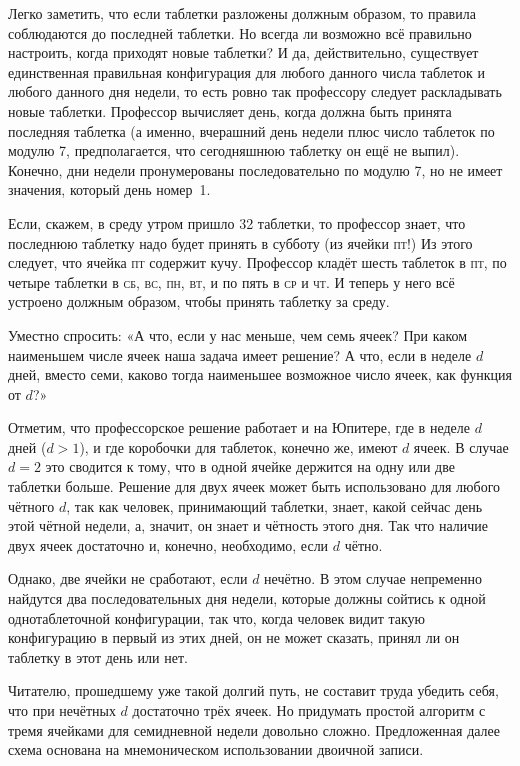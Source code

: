 Легко заметить, что если таблетки разложены должным образом, то правила соблюдаются до последней таблетки.
Но всегда ли возможно всё правильно настроить, когда приходят новые таблетки?
И да, действительно, существует единственная правильная конфигурация для любого данного числа таблеток и любого данного дня недели, то есть ровно так профессору следует раскладывать новые таблетки.
Профессор вычисляет день, когда должна быть принята последняя таблетка (а именно, вчерашний день недели плюс число таблеток по модулю 7,
предполагается, что сегодняшнюю таблетку он ещё не выпил).
Конечно, дни недели пронумерованы последовательно  по модулю 7, но не имеет значения, который день номер~1.

Если, скажем, в среду утром пришло 32 таблетки, то профессор знает, что последнюю таблетку надо будет принять в субботу (из ячейки \textsc{пт}!) Из этого следует, что ячейка \textsc{пт} содержит кучу.
Профессор кладёт шесть таблеток в \textsc{пт}, по четыре таблетки в \textsc{сб}, \textsc{вс}, \textsc{пн}, \textsc{вт}, и по пять в \textsc{ср} и \textsc{чт}.
И теперь у него всё устроено должным образом, чтобы принять таблетку за среду.
\heart

Уместно спросить:
«А что, если у нас меньше, чем семь ячеек?
При каком наименьшем числе ячеек наша задача имеет решение?
А что, если в неделе $d$ дней, вместо семи,
каково тогда наименьшее возможное число ячеек, как функция от $d$?»

Отметим, что профессорское решение работает и на Юпитере, где в неделе $d$ дней ($d>1$), и где коробочки для таблеток, конечно же, имеют $d$ ячеек.
В случае $d=2$ это сводится к тому, что в одной ячейке держится на одну или две таблетки больше.
Решение для двух ячеек может быть использовано для любого чётного $d$, так как человек, принимающий таблетки, знает, какой сейчас день этой чётной недели, а, значит, он знает и чётность этого дня.
Так что наличие двух ячеек достаточно и, конечно, необходимо, если $d$ чётно.

Однако, две ячейки не сработают, если $d$ нечётно.
В этом случае непременно найдутся два последовательных дня недели, которые должны сойтись к одной однотаблеточной конфигурации, так что, когда человек видит такую конфигурацию в первый из этих дней, он не может сказать, принял ли он таблетку в этот день или нет.

Читателю, прошедшему уже такой долгий путь, не составит труда убедить себя, что при нечётных $d$ достаточно трёх ячеек.
Но придумать простой алгоритм с тремя ячейками для семидневной недели довольно сложно.
Предложенная далее схема основана на мнемоническом использовании двоичной записи.

